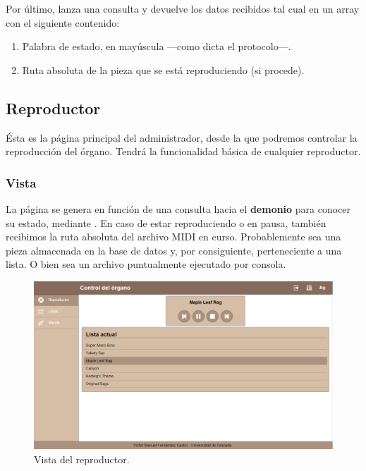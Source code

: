 Por último,  lanza una consulta y devuelve los datos recibidos tal cual en un array con el siguiente contenido:

\begin{enumerate}
	\item Palabra de estado, en mayúscula ---como dicta el protocolo---.
	\item Ruta absoluta de la pieza que se está reproduciendo (si procede).
\end{enumerate}

\subsection{Reproductor}

Ésta es la página principal del administrador, desde la que podremos controlar la reproducción del órgano. Tendrá la funcionalidad básica de cualquier reproductor.

\subsubsection{Vista}

La página se genera en función de una consulta hacia el \textbf{demonio} para conocer su estado, mediante . En caso de estar reproduciendo o en pausa, también recibimos la ruta absoluta del archivo MIDI en curso. Probablemente sea una pieza almacenada en la base de datos y, por consiguiente, perteneciente a una lista. O bien sea un archivo puntualmente ejecutado por consola.

\smallskip

\begin{figure}[H]
	\noindent \begin{centering}
		\includegraphics[width=\linewidth*2/3]{capitulo5/cap_reproductor}
		\par\end{centering}
	\smallskip
	\caption{\label{fig:cap_reproductor} Vista del reproductor.}
\end{figure} 

